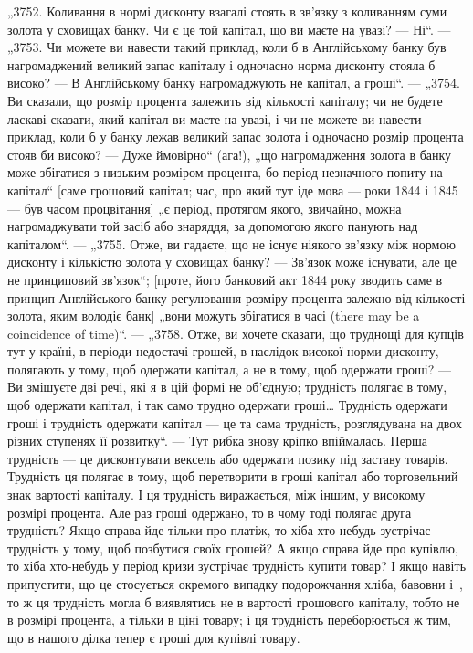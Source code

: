 „3752. Коливання в нормі дисконту взагалі стоять в зв’язку
з коливанням суми золота у сховищах банку. Чи є це той капітал, що ви маєте на увазі? — Ні“. —
„3753. Чи можете ви навести такий приклад, коли б в Англійському банку був нагромаджений великий
запас капіталу і одночасно норма дисконту
стояла б високо? — В Англійському банку нагромаджують не
капітал, а гроші“. — „3754. Ви сказали, що розмір процента залежить від кількості капіталу; чи не
будете ласкаві сказати,
який капітал ви маєте на увазі, і чи не можете ви навести приклад, коли б у банку лежав великий
запас золота і одночасно
розмір процента стояв би високо? — Дуже ймовірно“ (ага!),
„що нагромадження золота в банку може збігатися з низьким розміром процента, бо період незначного
попиту на капітал“
[саме грошовий капітал; час, про який тут іде мова — роки 1844
і 1845 — був часом процвітання] „є період, протягом якого, звичайно,
можна нагромаджувати той засіб або знаряддя, за допомогою якого панують над капіталом“. —
„3755. Отже, ви гадаєте,
що не існує ніякого зв’язку між нормою дисконту і кількістю
золота у сховищах банку? — Зв’язок може існувати, але це не
принциповий зв’язок“; [проте, його банковий акт 1844 року
зводить саме в принцип Англійського банку регулювання розміру процента залежно від кількості золота,
яким володіє банк]
„вони можуть збігатися в часі (there may be a coincidence
of time)“. — „3758. Отже, ви хочете сказати, що труднощі для купців тут у країні, в періоди
недостачі грошей, в наслідок високої
норми дисконту, полягають у тому, щоб одержати капітал, а не
в тому, щоб одержати гроші? — Ви змішуєте дві речі, які я в
цій формі не об’єдную; трудність полягає в тому, щоб одержати капітал, і так само трудно одержати
гроші\dots{} Трудність одержати гроші і трудність одержати капітал — це
та сама трудність, розглядувана на двох різних ступенях
її розвитку“. — Тут рибка знову кріпко впіймалась. Перша
трудність — це дисконтувати вексель або одержати позику під
заставу товарів. Трудність ця полягає в тому, щоб перетворити
в гроші капітал або торговельний знак вартості капіталу. І ця
трудність виражається, між іншим, у високому розмірі процента.
Але раз гроші одержано, то в чому тоді полягає друга трудність? Якщо справа йде тільки про платіж,
то хіба хто-небудь
зустрічає трудність у тому, щоб позбутися своїх грошей? А якщо справа йде про купівлю, то хіба
хто-небудь у період кризи
зустрічає трудність купити товар? І якщо навіть припустити,
що це стосується окремого випадку подорожчання хліба, бавовни і~, то ж ця трудність могла б
виявлятись не
в вартості грошового капіталу, тобто не в розмірі процента, а
тільки в ціні товару; і ця трудність переборюється ж тим,
що в нашого ділка тепер є гроші для купівлі товару.

